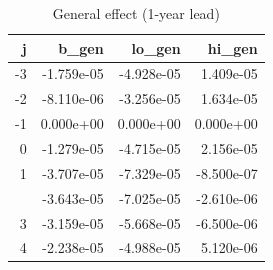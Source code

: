 \begin{table}

\caption{General effect (1-year lead)}
\centering
\begin{tabular}[t]{rrrr}
\toprule
j & b\_gen & lo\_gen & hi\_gen\\
\midrule
-3 & -1.759e-05 & -4.928e-05 & 1.409e-05\\
-2 & -8.110e-06 & -3.256e-05 & 1.634e-05\\
-1 & 0.000e+00 & 0.000e+00 & 0.000e+00\\
0 & -1.279e-05 & -4.715e-05 & 2.156e-05\\
1 & -3.707e-05 & -7.329e-05 & -8.500e-07\\
\addlinespace
2 & -3.643e-05 & -7.025e-05 & -2.610e-06\\
3 & -3.159e-05 & -5.668e-05 & -6.500e-06\\
4 & -2.238e-05 & -4.988e-05 & 5.120e-06\\
\bottomrule
\end{tabular}
\end{table}
